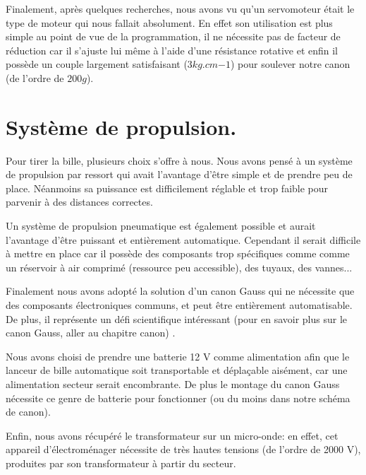 Finalement, après quelques recherches, nous avons vu qu'un servomoteur était le type de moteur qui nous fallait absolument. En effet son utilisation est plus simple au point de vue de la programmation, il  ne nécessite pas de facteur de réduction car il s'ajuste lui même à l'aide d'une résistance rotative et enfin il possède un couple largement satisfaisant ($3kg.cm{-1}$) pour soulever notre canon (de l'ordre de $200g$).

\section{Système de propulsion.}
Pour tirer la bille, plusieurs choix s'offre à nous. Nous avons pensé à un système de propulsion par ressort qui avait l'avantage d'être simple et de prendre peu de place. Néanmoins sa puissance est difficilement réglable et trop faible pour parvenir à des distances correctes. 

Un système de propulsion pneumatique est également possible et aurait l'avantage d'être puissant et entièrement automatique. Cependant il serait difficile à mettre en place car il possède des composants trop spécifiques  comme comme un réservoir à air comprimé (ressource peu accessible), des tuyaux, des vannes...

Finalement nous avons adopté la solution d'un canon Gauss qui ne nécessite   que  des composants électroniques communs, et peut être entièrement automatisable. De plus, il représente un défi scientifique intéressant (pour en savoir plus sur le canon Gauss, aller au chapitre {canon}) .

Nous avons choisi de prendre une batterie 12 V comme alimentation afin que le lanceur de bille automatique soit transportable et déplaçable aisément, car une alimentation secteur serait encombrante. De plus le montage du canon Gauss nécessite ce genre de batterie pour fonctionner (ou du moins dans notre schéma de canon).

Enfin, nous avons récupéré  le transformateur sur un micro-onde: en effet, cet appareil d'électroménager nécessite de très hautes tensions (de l'ordre de 2000 V), produites par son transformateur à partir du secteur.
